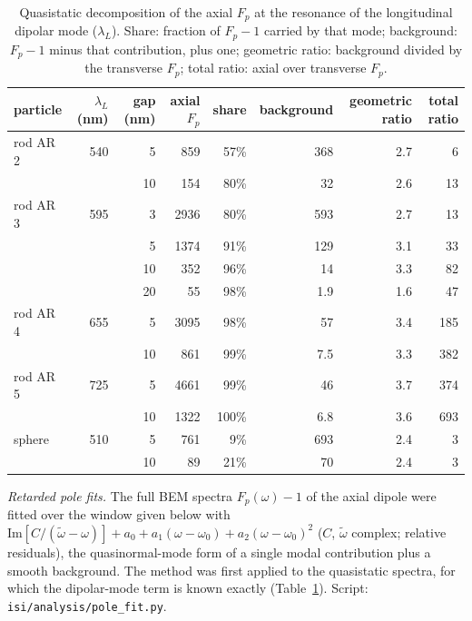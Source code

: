 \documentclass[11pt,a4paper]{article}
\newcommand{\Fp}{F_p}
\begin{document}
\begin{table}[h]\centering
\caption{Quasistatic decomposition of the axial $\Fp$ at the resonance of the longitudinal dipolar mode
($\lambda_L$). Share: fraction of $\Fp-1$ carried by that mode; background: $\Fp-1$ minus that contribution, plus
one; geometric ratio: background divided by the transverse $\Fp$; total ratio: axial over transverse $\Fp$.}\label{tab:modes}
\begin{tabular}{lrrrrrrr}\toprule
particle & $\lambda_L$ (nm) & gap (nm) & axial $\Fp$ & share & background & geometric ratio & total ratio\\\midrule
rod AR 2 & 540 & 5  & 859  & 57\% & 368 & 2.7 & 6\\
         &     & 10 & 154  & 80\% & 32  & 2.6 & 13\\
rod AR 3 & 595 & 3  & 2936 & 80\% & 593 & 2.7 & 13\\
         &     & 5  & 1374 & 91\% & 129 & 3.1 & 33\\
         &     & 10 & 352  & 96\% & 14  & 3.3 & 82\\
         &     & 20 & 55   & 98\% & 1.9 & 1.6 & 47\\
rod AR 4 & 655 & 5  & 3095 & 98\% & 57  & 3.4 & 185\\
         &     & 10 & 861  & 99\% & 7.5 & 3.3 & 382\\
rod AR 5 & 725 & 5  & 4661 & 99\% & 46  & 3.7 & 374\\
         &     & 10 & 1322 & 100\% & 6.8 & 3.6 & 693\\
sphere   & 510 & 5  & 761  & 9\%  & 693 & 2.4 & 3\\
         &     & 10 & 89   & 21\% & 70  & 2.4 & 3\\\bottomrule
\end{tabular}\end{table}

\emph{Retarded pole fits.} The full BEM spectra $\Fp(\omega)-1$ of the axial dipole were fitted over the window
given below with $\mathrm{Im}[C/(\tilde\omega-\omega)]+a_0+a_1(\omega-\omega_0)+a_2(\omega-\omega_0)^2$ ($C$,
$\tilde\omega$ complex; relative residuals), the quasinormal-mode form of a single modal contribution plus a smooth
background. The method was first applied to the quasistatic spectra, for which the dipolar-mode term is known
exactly (Table~\ref{tab:modes}). Script: \texttt{isi/analysis/pole\_fit.py}.
\end{document}
